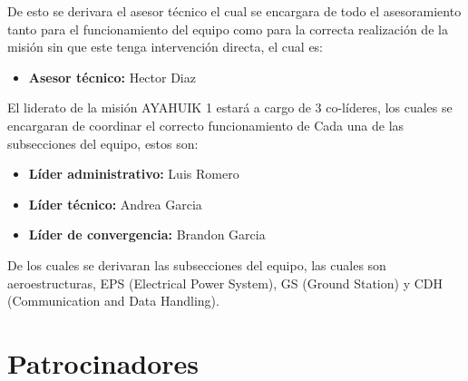 \documentclass[letterpaper,12pt]{article} %
\begin{document}
    De esto se derivara el asesor técnico el cual se encargara de todo el asesoramiento tanto para el funcionamiento del equipo
    como para la correcta realización de la misión sin que este tenga intervención directa, el cual es:

    \begin{itemize}
        \item \textbf{Asesor técnico:} Hector Diaz

    \end{itemize}


    \vspace{5mm}

    El liderato de la misión AYAHUIK 1 estará a cargo de 3 co-líderes,
    los cuales se encargaran de coordinar el correcto funcionamiento de Cada
    una de las subsecciones del equipo, estos son:

    \begin{itemize}
        \item \textbf{Líder administrativo:} Luis Romero
        \item \textbf{Líder técnico:} Andrea Garcia
        \item \textbf{Líder de convergencia:} Brandon Garcia
    
    \end{itemize}

    De los cuales se derivaran las subsecciones del equipo, las cuales son aeroestructuras, EPS (Electrical Power System), GS (Ground Station) y CDH (Communication and Data Handling).

    \newpage
    \section{Patrocinadores}
    \captionsetup[subfigure]{labelformat=empty}
\end{document}
